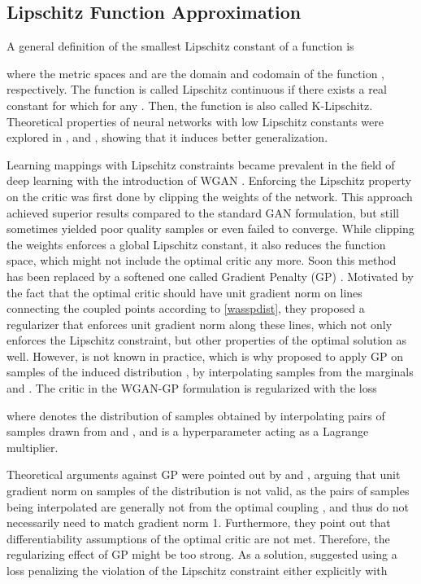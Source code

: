 \documentclass{article}
\begin{document}
\subsection{Lipschitz Function Approximation}
A general definition of the smallest Lipschitz constant of a function  is

where the metric spaces  and  are the domain and codomain of the function , respectively. The function  is called Lipschitz continuous if there exists a real constant  for which  for any . Then, the function  is also called K-Lipschitz. Theoretical properties of neural networks with low Lipschitz constants were explored in \citet{Obermanetal2018}, \citet{Bartlett98} and \citet{Druckeretal92}, showing that it induces better generalization.

Learning mappings with Lipschitz constraints became prevalent in the field of deep learning with the introduction of WGAN \citep{Arjovskyetal2017}. Enforcing the Lipschitz property on the critic was first done by clipping the weights of the network. This approach achieved superior results compared to the standard GAN formulation, but still sometimes yielded poor quality samples or even failed to converge. While clipping the weights enforces a global Lipschitz constant, it also reduces the function space, which might not include the optimal critic any more. Soon this method has been replaced by a softened one called Gradient Penalty (GP) \citep{Gulrajanietal2017}. Motivated by the fact that the optimal critic should have unit gradient norm on lines connecting the coupled points  according to \eqref{wasspdist}, they proposed a regularizer that enforces unit gradient norm along these lines, which not only enforces the Lipschitz constraint, but other properties of the optimal solution as well. However,  is not known in practice, which is why \citet{Gulrajanietal2017} proposed to apply GP on samples of the induced distribution , by interpolating samples from the marginals  and . The critic in the WGAN-GP formulation is regularized with the loss

where  denotes the distribution of samples obtained by interpolating pairs of samples drawn from  and , and  is a hyperparameter acting as a Lagrange multiplier.

Theoretical arguments against GP were pointed out by \citet{Petzkaetal2018} and \citet{Gemicietal2018}, arguing that unit gradient norm on samples of the distribution  is not valid, as the pairs of samples being interpolated are generally not from the optimal coupling , and thus do not necessarily need to match gradient norm 1. Furthermore, they point out that differentiability assumptions of the optimal critic are not met. Therefore, the regularizing effect of GP might be too strong. As a solution, \citet{Petzkaetal2018} suggested using a loss penalizing the violation of the Lipschitz constraint either explicitly with
\end{document}
